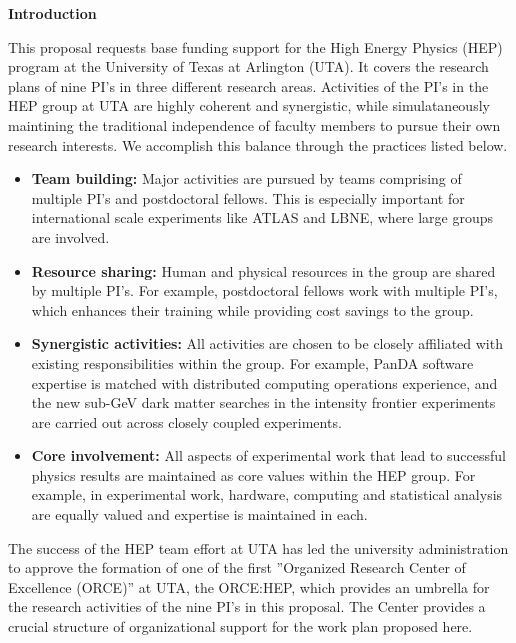 \begin{center}
\Large\textbf{Introduction}
\end{center}

This proposal requests base funding support for the High Energy Physics (HEP) program at the University of Texas at Arlington (UTA). It covers the research plans of nine PI's in three different research areas. Activities of the PI's in the HEP group at UTA are highly coherent and synergistic, while simulataneously maintining the traditional independence of faculty members to pursue their own research interests. We accomplish this balance through the practices listed below.

\begin{itemize}[noitemsep,nolistsep]

\item \textbf{Team building:} Major activities are pursued by teams comprising of multiple PI's and postdoctoral fellows. This is especially important for international scale experiments like ATLAS and LBNE, where large groups are involved.

\item \textbf{Resource sharing:} Human and physical resources in the group are shared by multiple PI's. For example, postdoctoral fellows work with multiple PI's, which enhances their training while providing cost savings to the group.

\item \textbf{Synergistic activities:} All activities are chosen to be closely affiliated with existing responsibilities within the group. For example, PanDA software expertise is matched with distributed computing operations experience, and the new sub-GeV dark matter searches in the intensity frontier experiments are carried out across closely coupled experiments.

\item \textbf{Core involvement:} All aspects of experimental work that lead to successful physics results are maintained as core values within the HEP group. For example, in experimental work, hardware, computing and statistical analysis are equally valued and expertise is maintained in each.

\end{itemize}

\noindent The success of the HEP team effort at UTA has led the university administration to approve the formation of one of the first ''Organized Research Center of Excellence (ORCE)'' at UTA, the ORCE:HEP, which provides an umbrella for the research activities of the nine PI's in this proposal. The Center provides a crucial structure of organizational support for the work plan proposed here.

